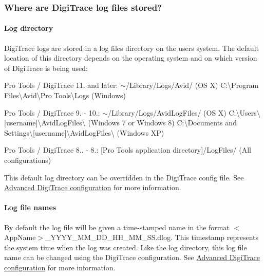 \hypertarget{a00364_digitrace__logfiles__wherearethelogs}{}\subsubsection{Where are Digi\+Trace log files stored?}\label{a00364_digitrace__logfiles__wherearethelogs}
 \hypertarget{a00364_digitrace__logfiles__wherearethelogs__directory}{}\paragraph{Log directory}\label{a00364_digitrace__logfiles__wherearethelogs__directory}
 Digi\+Trace logs are stored in a log files directory on the user\textquotesingle{}s system. The default location of this directory depends on the operating system and on which version of Digi\+Trace is being used\+:

 
\begin{DoxyItemize}
\item Pro Tools / Digi\+Trace 11. and later\+: $\sim$/\+Library/\+Logs/\+Avid/ (O\+S X)  C\+:\textbackslash{}Program Files\textbackslash{}Avid\textbackslash{}Pro Tools\textbackslash{}Logs (Windows)   
\item Pro Tools / Digi\+Trace 9. -\/ 10.\+: $\sim$/\+Library/\+Logs/\+Avid\+Log\+Files/ (O\+S X)  C\+:\textbackslash{}Users\textbackslash{}\mbox{[}username\mbox{]}\textbackslash{}Avid\+Log\+Files\textbackslash{} (Windows 7 or Windows 8)  C\+:\textbackslash{}Documents and Settings\textbackslash{}\mbox{[}username\mbox{]}\textbackslash{}Avid\+Log\+Files\textbackslash{} (Windows X\+P)   
\item Pro Tools / Digi\+Trace 8.. -\/ 8.\+: \mbox{[}Pro Tools application directory\mbox{]}/\+Log\+Files/ (All configurations)   
\end{DoxyItemize}

 This default log directory can be overridden in the Digi\+Trace config file. See \hyperlink{a00364_digitrace__advancedconfiguration}{Advanced Digi\+Trace configuration} for more information.

\hypertarget{a00364_digitrace__logfiles__wherearethelogs__name}{}\paragraph{Log file names}\label{a00364_digitrace__logfiles__wherearethelogs__name}
 By default the log file will be given a time-\/stamped name in the format {\ttfamily $<$App\+Name$>$\+\_\+\+Y\+Y\+Y\+Y\+\_\+\+M\+M\+\_\+\+D\+D\+\_\+\+H\+H\+\_\+\+M\+M\+\_\+\+S\+S.\+dlog}. This timestamp represents the system time when the log was created. Like the log directory, this log file name can be changed using the Digi\+Trace configuration. See \hyperlink{a00364_digitrace__advancedconfiguration}{Advanced Digi\+Trace configuration} for more information.

